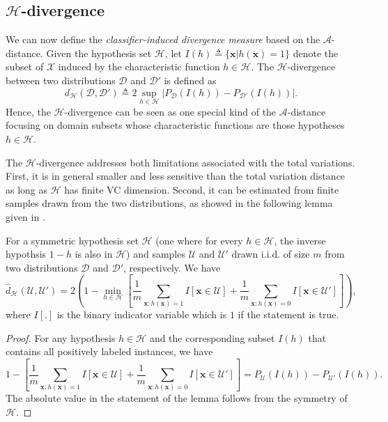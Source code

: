 \subsection{$\mathcal{H}$-divergence}
We can now define the \textit{classifier-induced divergence measure} based on the $\mathcal{A}$-distance. Given the hypothesis set $\mathcal{H}$, let $I(h) \triangleq \{ \mathbf{x} \vert h(\mathbf{x})=1 \}$ denote the subset of $\mathcal{X}$ induced by the characteristic function $h \in \mathcal{H}$. The $\mathcal{H}$-divergence between two distributions $\mathcal{D}$ and $\mathcal{D}'$ is defined as
\begin{equation}\label{eq:h_divergence}
  d_{\mathcal{H}}(\mathcal{D}, \mathcal{D}') \triangleq 2\sup_{h \in \mathcal{H}} \vert P_{\mathcal{D}}(I(h))-P_{\mathcal{D}'}(I(h)) \vert.
\end{equation}
Hence, the $\mathcal{H}$-divergence can be seen as one special kind of the $\mathcal{A}$-distance focusing on domain subsets whose characteristic functions are those hypotheses $h \in \mathcal{H}$.

The $\mathcal{H}$-divergence addresses both limitations associated with the total variations. First, it is in general smaller and less sensitive than the total variation distance as long as $\mathcal{H}$ has finite VC dimension. Second, it can be estimated from finite samples drawn from the two distributions, as showed in the following lemma given in \cite{BenDavid2006}.

\begin{lemma}\label{lem:emp_h_divergence}
  For a symmetric hypothesis set $\mathcal{H}$ (one where for every $h \in \mathcal{H}$, the inverse hypothsis $1-h$ is also in $\mathcal{H}$) and samples $\mathcal{U}$ and $\mathcal{U}'$ drawn i.i.d. of size $m$ from two distributions $\mathcal{D}$ and $\mathcal{D}'$, respectively. We have
  \begin{equation}\label{eq:emp_h_divergence}
    \hat{d}_{\mathcal{H}}(\mathcal{U}, \mathcal{U}')=2 \left( 1-\min_{h \in \mathcal{H}} \left[ \frac{1}{m} \sum_{\mathbf{x}:h(\mathbf{x})=1}I[\mathbf{x} \in \mathcal{U}]+\frac{1}{m} \sum_{\mathbf{x}:h(\mathbf{x})=0}I[\mathbf{x} \in \mathcal{U}'] \right] \right),
  \end{equation}
  where $I[.]$ is the binary indicator variable which is $1$ if the statement is true.
\end{lemma}
\begin{proof}
  For any hypothesis $h \in \mathcal{H}$ and the corresponding subset $I(h)$ that contains all positively labeled instances, we have
  \begin{equation}\label{eq:emp_h_divergence_pf}
    1 - \left[ \frac{1}{m} \sum_{\mathbf{x}:h(\mathbf{x})=1}I[\mathbf{x} \in \mathcal{U}]+\frac{1}{m} \sum_{\mathbf{x}:h(\mathbf{x})=0}I[\mathbf{x} \in \mathcal{U}'] \right]
    =
    P_{\mathcal{U}}(I(h))-P_{\mathcal{U}'}(I(h)).
  \end{equation}
  The absolute value in the statement of the lemma follows from the symmetry of $\mathcal{H}$.
\end{proof}

